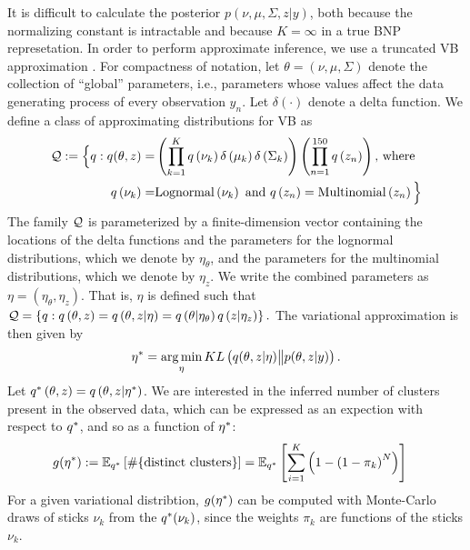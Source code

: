 %
It is difficult to calculate the posterior $p\left(\nu, \mu, \Sigma, z \vert
y\right)$, both because the normalizing constant is intractable and because
$K=\infty$ in a true BNP represetation. In order to perform approximate
inference, we use a truncated VB approximation
\citep{blei:2006:dirichletbnp}. For compactness of notation, let $\theta =
\left(\nu, \mu, \Sigma\right)$ denote the collection of ``global'' parameters,
i.e., parameters whose values affect the data generating process of every
observation $y_n$.   Let $\delta\left(\cdot\right)$ denote a delta function. We
define a class of approximating distributions for VB as
%
\begin{align*}
\mathcal{Q} := \Big\{ q:
q(\theta, z) = &
\left(\prod_{k=1}^{K}q\left(\nu_{k}\right)\delta\left(\mu_{k}\right)
    \delta\left(\Sigma_{k}\right)\right)
    \left(\prod_{n=1}^{150}q\left(z_{n}\right) \right)\textrm{, where } \\
q\left(\nu_{k}\right) =& \mathrm{Lognormal}\left(\nu_k\right) \textrm{ and }
q\left(z_n\right) = \mathrm{Multinomial}\left(z_n\right)
\Big\}
\end{align*}
%
The family $\mathcal{Q}$ is parameterized by a finite-dimension vector containing
the locations of the delta functions and the parameters for the lognormal
distributions, which we denote by $\eta_\theta$, and the parameters for the
multinomial distributions, which we denote by $\eta_z$.
We write the combined parameters as $\eta=\left(\eta_\theta, \eta_z\right)$.
That is, $\eta$ is defined such that
%
$\mathcal{Q} =
    \left\{q: q\left(\theta, z\right) =
            q\left(\theta, z \vert \eta \right) =
            q\left(\theta \vert \eta_\theta \right)
            q\left(z \vert \eta_z \right)
    \right\}.$
%
The variational approximation is then given by
%
\begin{align}
\eta^{*} = \operatorname*{arg\,min}_{\eta} KL\left(
    q(\theta, z \vert \eta) \big\| p(\theta, z | y)
    \right). \label{eq:kl_objective}
\end{align}
%
Let $q^{*}\left(\theta, z\right) = q\left(\theta, z \vert \eta^{*}\right)$.
We are interested in the inferred number of clusters present in the observed
data, which can be expressed as an expection with respect to $q^{*}$,
and so as a function of $\eta^{*}$:
%
\begin{align}
g(\eta^{*}) :=
\mathbb{E}_{q^{*}} \left[ \#\{\text{distinct clusters}\} \right]  &=
\mathbb{E}_{q^{*}} \left[\sum_{i=1}^K \left(1 - \left(1 - \pi_k\right)^N\right)
    \right]
    \label{eq:expected_num_clusters}
\end{align}
%
For a given variational distribtion, $g(\eta^{*})$ can be computed with
Monte-Carlo draws of sticks $\nu_k$ from the $q^{*}(\nu_k)$,
since the weights $\pi_k$ are functions of the sticks $\nu_k$.
